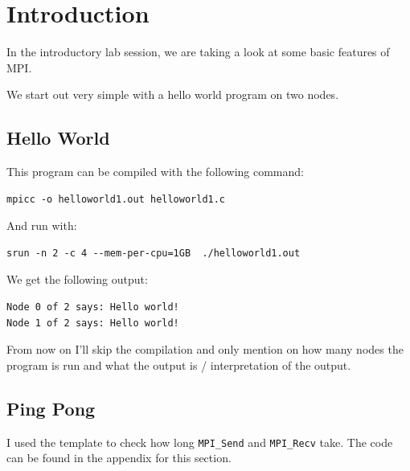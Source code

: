 \setcounter{section}{-1}
\section{Introduction}
In the introductory lab session, we are taking a look at some basic features of MPI. 

We start out very simple with a hello world program on two nodes. 

\subsection*{Hello World}

This program can be compiled with the following command:\\

\begin{verbatim}
mpicc -o helloworld1.out helloworld1.c
\end{verbatim}
And run with:
\begin{verbatim}
srun -n 2 -c 4 --mem-per-cpu=1GB  ./helloworld1.out
\end{verbatim}
We get the following output:
\begin{verbatim}
Node 0 of 2 says: Hello world!
Node 1 of 2 says: Hello world!
\end{verbatim}

From now on I'll skip the compilation and only mention on how many nodes the program is run and what the output is / interpretation of the output.

\subsection{Ping Pong}
I used the template to check how long \texttt{MPI\_Send} and \texttt{MPI\_Recv} take. The code can be found in the appendix for this section. \\

